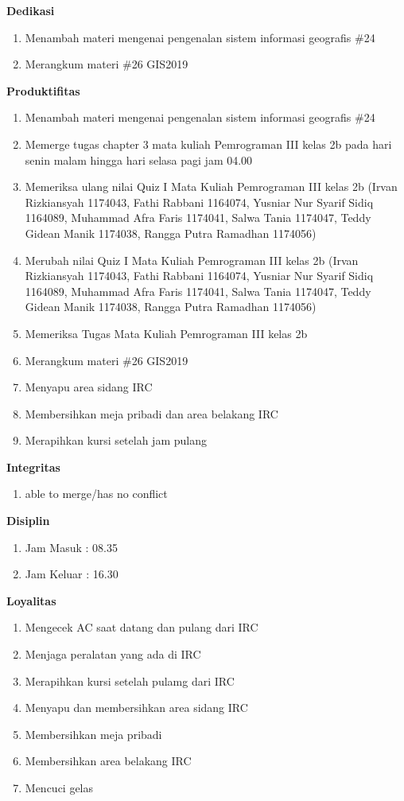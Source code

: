 \begin{enumerate}
\textbf{Dedikasi}
\begin{enumerate}
\item Menambah materi mengenai pengenalan sistem informasi geografis \#24
\item Merangkum materi \#26 GIS2019
\end{enumerate}

\textbf{Produktifitas}
\begin{enumerate}
\item Menambah materi mengenai pengenalan sistem informasi geografis \#24
\item Memerge tugas chapter 3 mata kuliah Pemrograman III kelas 2b pada hari senin malam hingga hari selasa pagi jam 04.00
\item Memeriksa ulang nilai Quiz I Mata Kuliah Pemrograman III kelas 2b (Irvan Rizkiansyah 1174043, Fathi Rabbani 1164074, Yusniar Nur Syarif Sidiq 1164089, Muhammad Afra Faris 1174041, Salwa Tania 1174047, Teddy Gidean Manik 1174038, Rangga Putra Ramadhan 1174056)
\item Merubah nilai Quiz I Mata Kuliah Pemrograman III kelas 2b (Irvan Rizkiansyah 1174043, Fathi Rabbani 1164074, Yusniar Nur Syarif Sidiq 1164089, Muhammad Afra Faris 1174041, Salwa Tania 1174047, Teddy Gidean Manik 1174038, Rangga Putra Ramadhan 1174056)
\item Memeriksa Tugas Mata Kuliah Pemrograman III kelas 2b
\item Merangkum materi \#26 GIS2019
\item Menyapu area sidang IRC
\item Membersihkan meja pribadi dan area belakang IRC
\item Merapihkan kursi setelah jam pulang 
\end{enumerate}

\textbf{Integritas}
\begin{enumerate}
\item able to merge/has no conflict
\end{enumerate}


\textbf{Disiplin}
\begin{enumerate}
\item Jam Masuk : 08.35
\item Jam Keluar : 16.30
\end{enumerate}


\textbf{Loyalitas}
\begin{enumerate}
\item Mengecek AC saat datang dan pulang dari IRC
\item Menjaga peralatan yang ada di IRC
\item Merapihkan kursi setelah pulamg dari IRC
\item Menyapu dan membersihkan area sidang IRC
\item Membersihkan meja pribadi
\item Membersihkan area belakang IRC
\item Mencuci gelas
\end{enumerate}



\end{enumerate}
